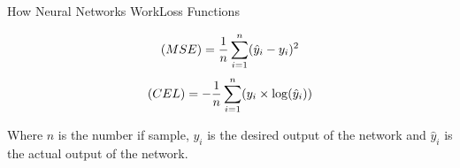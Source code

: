 \documentclass{beamer}
\begin{document}

\begin{frame}{How Neural Networks Work}{Loss Functions}
    \begin{multicols}{2}
        \begin{equation*}
            \text(MSE) = \frac{1}{n}\sum_{i=1}^{n}(\hat{y}_i-y_i)^2
        \end{equation*}
        \begin{equation*}
            \text(CEL) = -\frac{1}{n}\sum_{i=1}^{n}(y_i\times\log(\hat{y}_i))
        \end{equation*}
    \end{multicols}
    Where $n$ is the number if sample, $y_i$ is the desired output of the network and $\hat{y}_i$ is the actual output of the network.
\end{frame}
\end{document}
